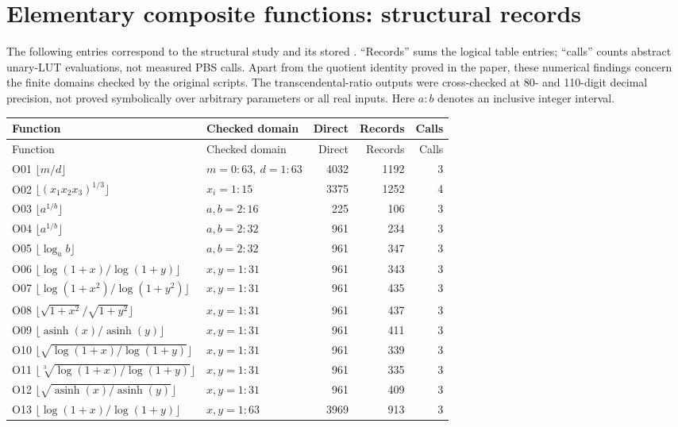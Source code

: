 \documentclass[a4paper,10pt]{article}
\begin{document}
\newpage
\section{Elementary composite functions: structural records}
The following entries correspond to the structural study and its stored . ``Records'' sums the logical table entries; ``calls'' counts abstract unary-LUT evaluations, not measured PBS calls. Apart from the quotient identity proved in the paper, these numerical findings concern the finite domains checked by the original scripts. The transcendental-ratio outputs were cross-checked at 80- and 110-digit decimal precision, not proved symbolically over arbitrary parameters or all real inputs. Here $a{:}b$ denotes an inclusive integer interval.

\begin{longtable}{@{}p{76mm}p{38mm}rrr@{}}
\toprule
Function & Checked domain & Direct & Records & Calls\\\midrule
\endfirsthead
\toprule
Function & Checked domain & Direct & Records & Calls\\\midrule
\endhead
O01 $\lfloor m/d\rfloor$ & $m=0{:}63,\ d=1{:}63$ & 4032 & 1192 & 3\\
O02 $\lfloor(x_1x_2x_3)^{1/3}\rfloor$ & $x_i=1{:}15$ & 3375 & 1252 & 4\\
O03 $\lfloor a^{1/b}\rfloor$ & $a,b=2:16$ & 225 & 106 & 3\\
O04 $\lfloor a^{1/b}\rfloor$ & $a,b=2:32$ & 961 & 234 & 3\\
O05 $\lfloor\log_a b\rfloor$ & $a,b=2:32$ & 961 & 347 & 3\\
O06 $\lfloor\log(1+x)/\log(1+y)\rfloor$ & $x,y=1:31$ & 961 & 343 & 3\\
O07 $\lfloor\log(1+x^2)/\log(1+y^2)\rfloor$ & $x,y=1:31$ & 961 & 435 & 3\\
O08 $\lfloor\sqrt{1+x^2}/\sqrt{1+y^2}\rfloor$ & $x,y=1:31$ & 961 & 437 & 3\\
O09 $\lfloor\operatorname{asinh}(x)/\operatorname{asinh}(y)\rfloor$ & $x,y=1:31$ & 961 & 411 & 3\\
O10 $\lfloor\sqrt{\log(1+x)/\log(1+y)}\rfloor$ & $x,y=1:31$ & 961 & 339 & 3\\
O11 $\lfloor\sqrt[3]{\log(1+x)/\log(1+y)}\rfloor$ & $x,y=1:31$ & 961 & 335 & 3\\
O12 $\lfloor\sqrt{\operatorname{asinh}(x)/\operatorname{asinh}(y)}\rfloor$ & $x,y=1:31$ & 961 & 409 & 3\\
O13 $\lfloor\log(1+x)/\log(1+y)\rfloor$ & $x,y=1:63$ & 3969 & 913 & 3\\

\end{longtable}
\end{document}
